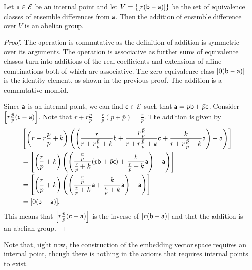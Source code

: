 \begin{mathSection}
	\begin{coro}
		Let $\ens[a] \in \Ens$ be an internal point and let $V = \{ [r(\ens[b]-\ens[a])] \}$ be the set of equivalence classes of ensemble differences from $\ens[a]$. Then the addition of ensemble difference over $V$ is an abelian group.
	\end{coro}
	
	\begin{proof}
		The operation is commutative as the definition of addition is symmetric over its arguments. The operation is associative as further sums of equivalence classes turn into additions of the real coefficients and extensions of affine combinations both of which are associative. The zero equivalence class $[0(\ens[b] - \ens[a])]$ is the identity element, as shown in the previous proof. The addition is a commutative monoid.
		
		Since $\ens[a]$ is an internal point, we can find $\ens[c] \in \Ens$ such that $\ens[a] = p \ens[b] + \bar{p} \ens[c]$. Consider $\left[r\frac{\bar{p}}{p}(\ens[c] - \ens[a])\right]$. Note that $r + r\frac{\bar{p}}{p} = \frac{r}{p}(p+\bar{p}) = \frac{r}{p}$. The addition is given by
		\begin{equation}
			\begin{aligned}
				&\left[\left(r+r\frac{\bar{p}}{p}+k\right) \left(\left(\frac{r}{r+r\frac{\bar{p}}{p}+k}\ens[b] + \frac{r\frac{\bar{p}}{p}}{r+r\frac{\bar{p}}{p}+k} \ens[c] +\frac{k}{r+r\frac{\bar{p}}{p}+k} \ens[a] \right) - \ens[a]\right)\right] \\
				&=\left[\left(\frac{r}{p}+k\right) \left(\left(\frac{\frac{r}{p}}{\frac{r}{p}+k}(p\ens[b] + \bar{p} \ens[c]) +\frac{k}{\frac{r}{p}+k} \ens[a] \right) - \ens[a]\right)\right] \\
				&=\left[\left(\frac{r}{p}+k\right) \left(\left(\frac{\frac{r}{p}}{\frac{r}{p}+k}\ens[a] +\frac{k}{\frac{r}{p}+k} \ens[a] \right) - \ens[a]\right)\right] \\
				&= [0(\ens[b] - \ens[a])].
			\end{aligned}
		\end{equation}
		This means that $\left[r\frac{\bar{p}}{p}(\ens[c] - \ens[a])\right]$ is the inverse of $[r(\ens[b] - \ens[a])]$ and that the addition is an abelian group.
	\end{proof}
	
	\begin{remark}
		Note that, right now, the construction of the embedding vector space requires an internal point, though there is nothing in the axioms that requires internal points to exist.
	\end{remark}
	

\end{mathSection}
